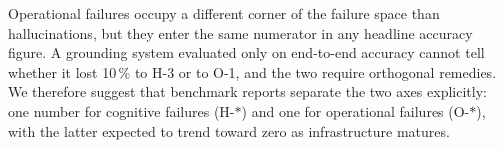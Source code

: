 Operational failures occupy a different corner of the failure space
than hallucinations, but they enter the same numerator in any
headline accuracy figure.  A grounding system evaluated only on
end-to-end accuracy cannot tell whether it lost 10\,\% to H-3 or to
O-1, and the two require orthogonal remedies.  We therefore suggest
that benchmark reports separate the two axes explicitly: one number
for cognitive failures (H-$\ast$) and one for operational failures
(O-$\ast$), with the latter expected to trend toward zero as
infrastructure matures.

